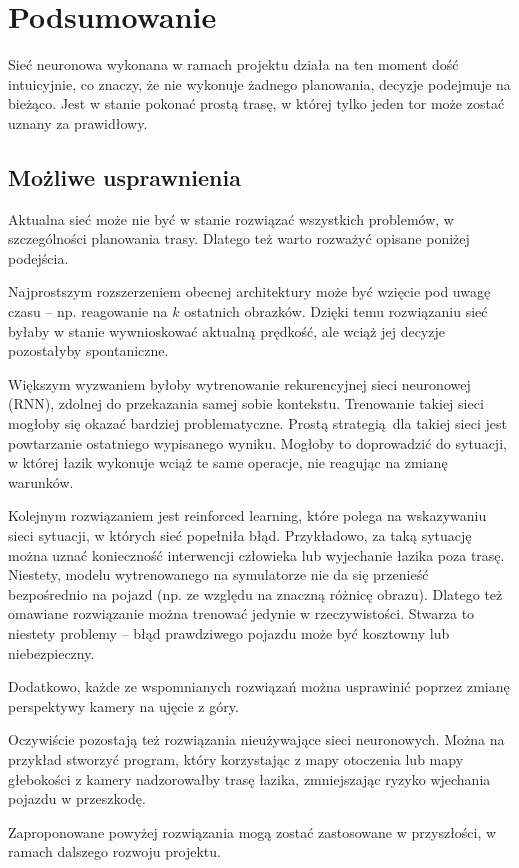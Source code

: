 \chapter{Podsumowanie}
Sieć neuronowa wykonana w ramach projektu działa na ten moment dość intuicyjnie, 
co znaczy, że nie wykonuje żadnego planowania, decyzje podejmuje na bieżąco. 
Jest w stanie pokonać prostą trasę, w której tylko jeden tor może zostać uznany 
za prawidłowy. 
\section{Możliwe usprawnienia}
Aktualna sieć może nie być w stanie rozwiązać wszystkich problemów, w szczególności
planowania trasy. Dlatego też warto rozważyć opisane poniżej podejścia.

Najprostszym rozszerzeniem obecnej architektury może być wzięcie pod uwagę czasu -- 
np. reagowanie na $k$ ostatnich obrazków. Dzięki temu rozwiązaniu sieć byłaby w 
stanie wywnioskować aktualną prędkość, ale wciąż jej decyzje pozostałyby
spontaniczne.

Większym wyzwaniem byłoby wytrenowanie rekurencyjnej sieci neuronowej (RNN), zdolnej
do przekazania samej sobie kontekstu. Trenowanie takiej sieci mogłoby się okazać 
bardziej problematyczne. Prostą strategią dla takiej sieci jest powtarzanie 
ostatniego wypisanego wyniku. Mogłoby to doprowadzić do sytuacji, w której  łazik
wykonuje wciąż te same operacje, nie reagując na zmianę warunków.

Kolejnym rozwiązaniem jest reinforced learning, które polega na wskazywaniu sieci
sytuacji, w których sieć popełniła błąd. Przykładowo, za taką sytuację można uznać
konieczność interwencji człowieka lub wyjechanie łazika poza trasę. 
Niestety, modelu wytrenowanego na symulatorze nie da się przenieść bezpośrednio 
na pojazd (np. ze względu na znaczną różnicę obrazu). Dlatego też omawiane rozwiązanie
można trenować jedynie w rzeczywistości. Stwarza to niestety problemy -- 
błąd prawdziwego pojazdu może być kosztowny lub niebezpieczny.

Dodatkowo, każde ze wspomnianych rozwiązań można usprawinić poprzez zmianę 
perspektywy kamery na ujęcie z góry.

Oczywiście pozostają też rozwiązania nieużywające sieci neuronowych. Można
na przykład stworzyć program, który korzystając z mapy otoczenia lub mapy głebokości
z kamery nadzorowałby trasę łazika, zmniejszając ryzyko wjechania pojazdu w przeszkodę.

Zaproponowane powyżej rozwiązania mogą zostać zastosowane w przyszłości, w ramach 
dalszego rozwoju projektu.

